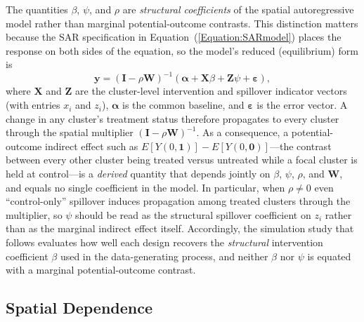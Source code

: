 \documentclass{article}[11pt]
\begin{document}
The quantities $\beta$, $\psi$, and $\rho$ are \emph{structural coefficients} of the spatial autoregressive model rather than marginal potential-outcome contrasts. This distinction matters because the SAR specification in Equation~(\ref{Equation:SARmodel}) places the response on both sides of the equation, so the model's reduced (equilibrium) form is
\begin{equation}\label{Equation:ReducedForm}
    \mathbf{y} = \left(\mathbf{I}-\rho \mathbf{W}\right)^{-1}\left(\boldsymbol\alpha + \mathbf{X}\beta + \mathbf{Z}\psi + \boldsymbol\varepsilon\right),
\end{equation}
where $\mathbf{X}$ and $\mathbf{Z}$ are the cluster-level intervention and spillover indicator vectors (with entries $x_i$ and $z_i$), $\boldsymbol\alpha$ is the common baseline, and $\boldsymbol\varepsilon$ is the error vector. A change in any cluster's treatment status therefore propagates to every cluster through the spatial multiplier $\left(\mathbf{I} - \rho\mathbf{W}\right)^{-1}$. As a consequence, a potential-outcome indirect effect such as $E[Y(0,\mathbf{1})] - E[Y(0,\mathbf{0})]$---the contrast between every other cluster being treated versus untreated while a focal cluster is held at control---is a \emph{derived} quantity that depends jointly on $\beta$, $\psi$, $\rho$, and $\mathbf{W}$, and equals no single coefficient in the model. In particular, when $\rho \neq 0$ even ``control-only'' spillover induces propagation among treated clusters through the multiplier, so $\psi$ should be read as the structural spillover coefficient on $z_i$ rather than as the marginal indirect effect itself. Accordingly, the simulation study that follows evaluates how well each design recovers the \emph{structural} intervention coefficient $\beta$ used in the data-generating process, and neither $\beta$ nor $\psi$ is equated with a marginal potential-outcome contrast.

\subsection{Spatial Dependence}\label{section:SpatialWeightsMatrix}
\end{document}
